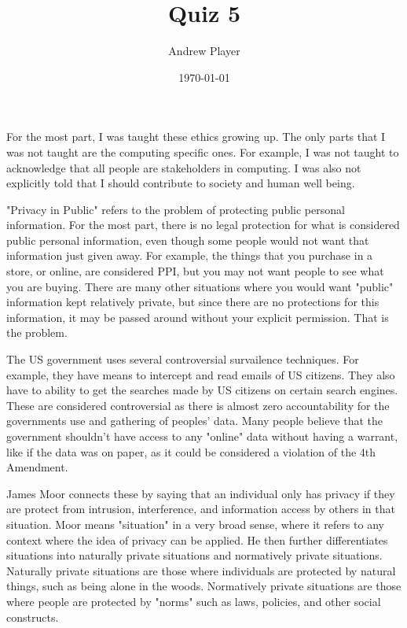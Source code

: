 \documentclass[12pt]{article}
\title{Quiz 5}
\author{Andrew Player}
\date{\today}
\makeatletter
\theoremstyle{homework}
\newenvironment{exercise}[1]
{\def\@currentlabel{#1}\exercisecore}
{\endexercisecore}
\makeatother
\begin{document}
\maketitle

\begin{exercise}{Question \# 1}
\end{exercise}
\noindent
For the most part, I was taught these ethics growing up. The only parts that 
I was not taught are the computing specific ones. For example, I was not taught
to acknowledge that all people are stakeholders in computing. I was also not 
explicitly told that I should contribute to society and human well being. 


\begin{exercise}{Question \# 2}
\end{exercise}
\noindent
"Privacy in Public" refers to the problem of protecting public personal information.
For the most part, there is no legal protection for what is considered public personal
information, even though some people would not want that information just given away. For
example, the things that you purchase in a store, or online, are considered PPI, but you 
may not want people to see what you are buying. There are many other situations where you
would want "public" information kept relatively private, but since there are no protections
for this information, it may be passed around without your explicit permission. That is the problem.

\begin{exercise}{Question \# 3}
\end{exercise}
\noindent
The US government uses several controversial survailence techniques. For example, they have means to
intercept and read emails of US citizens. They also have to ability to get the searches 
made by US citizens on certain search engines. These are considered controversial as there is almost
zero accountability for the governments use and gathering of peoples' data. Many people 
believe that the government shouldn't have access to any "online" data without having a warrant, 
like if the data was on paper, as it could be considered a violation of the 4th Amendment. 
\newline 

\begin{exercise}{Question \# 4}
\end{exercise}
\noindent
James Moor connects these by saying that an individual only has privacy if 
they are protect from intrusion, interference, and information access by others 
in that situation. Moor means "situation" in a very broad sense, where it refers
to any context where the idea of privacy can be applied. He then further differentiates
situations into naturally private situations and normatively private situations.
Naturally private situations are those where individuals are protected by natural things, 
such as being alone in the woods. Normatively private situations are those where
people are protected by "norms" such as laws, policies, and other social constructs.
\end{document}
